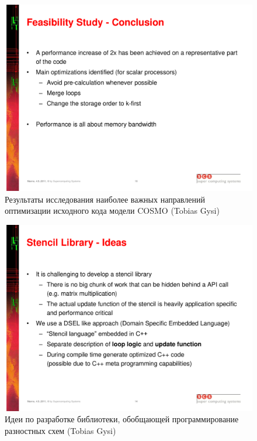 \documentclass[a4,12pt]{report}
\begin{document}
\begin{figure}
\centering
\includegraphics[scale=0.4]{slides/03.pdf}
\caption{Результаты исследования наиболее важных направлений оптимизации исходного кода модели COSMO (Tobias Gysi)}
\label{fig:03}
\end{figure}

\begin{figure}
\centering
\includegraphics[scale=0.4]{slides/04.pdf}
\caption{Идеи по разработке библиотеки, обобщающей программирование разностных схем (Tobias Gysi)}
\label{fig:04}
\end{figure}
\end{document}
